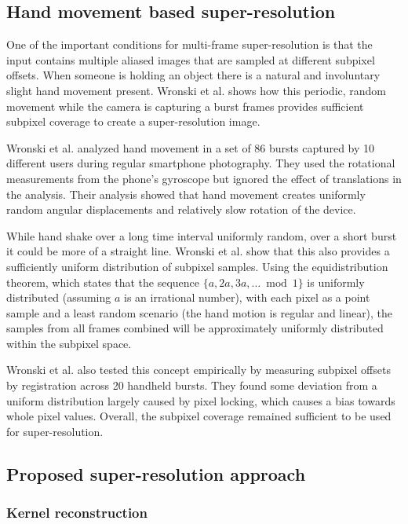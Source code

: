\documentclass{sig-alternate}
\begin{document}
\subsection{Hand movement based super-resolution}

One of the important conditions for multi-frame super-resolution is that the input contains multiple aliased images that are sampled at different subpixel offsets. When someone is holding an object there is a natural and involuntary slight hand movement present. Wronski et al. shows how this periodic, random movement while the camera is capturing a burst frames provides sufficient subpixel coverage to create a super-resolution image.

Wronski et al. analyzed hand movement in a set of 86 bursts captured by 10 different users during regular smartphone photography. They used the rotational measurements from the phone's gyroscope but ignored the effect of translations in the analysis. Their analysis showed that hand movement creates uniformly random angular displacements and relatively slow rotation of the device.


While hand shake over a long time interval uniformly random, over a short burst it could be more of a straight line.
Wronski et al. show that this also provides a sufficiently uniform distribution of subpixel samples.
Using the equidistribution theorem, which states that the sequence $\{a,2a,3a,\dotsc \bmod 1\}$ is uniformly distributed (assuming $a$ is an irrational number), with each pixel as a point sample and a least random scenario (the hand motion is regular and linear), the samples from all frames combined will be approximately uniformly distributed within the subpixel space.

Wronski et al. also tested this concept empirically by measuring subpixel offsets by registration across 20 handheld bursts. They found some deviation from a uniform distribution largely caused by pixel locking, which causes a bias towards whole pixel values. Overall, the subpixel coverage remained sufficient to be used for super-resolution.

\subsection{Proposed super-resolution approach}

\subsubsection{Kernel reconstruction}
\label{sec:kernelReconstruction}
\end{document}
